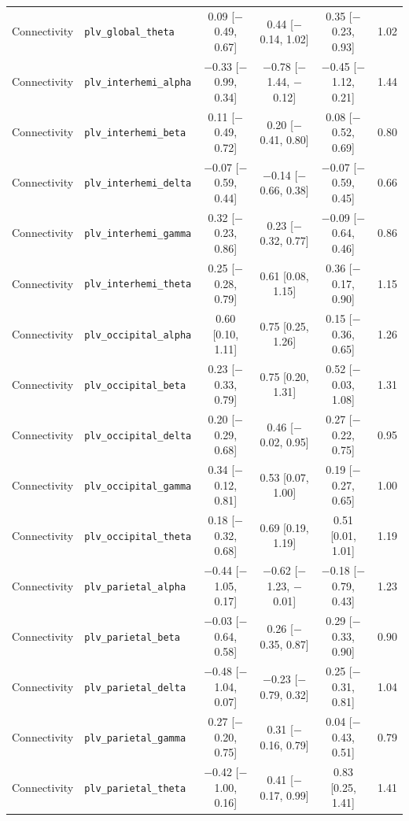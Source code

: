 {\begin{longtable}{llcccc}
Connectivity & \texttt{plv\_global\_theta} & 0.09 [$-$0.49, 0.67] & 0.44 [$-$0.14, 1.02] & 0.35 [$-$0.23, 0.93] & 1.02 \\
Connectivity & \texttt{plv\_interhemi\_alpha} & $-$0.33 [$-$0.99, 0.34] & $-$0.78 [$-$1.44, $-$0.12] & $-$0.45 [$-$1.12, 0.21] & 1.44 \\
Connectivity & \texttt{plv\_interhemi\_beta} & 0.11 [$-$0.49, 0.72] & 0.20 [$-$0.41, 0.80] & 0.08 [$-$0.52, 0.69] & 0.80 \\
Connectivity & \texttt{plv\_interhemi\_delta} & $-$0.07 [$-$0.59, 0.44] & $-$0.14 [$-$0.66, 0.38] & $-$0.07 [$-$0.59, 0.45] & 0.66 \\
Connectivity & \texttt{plv\_interhemi\_gamma} & 0.32 [$-$0.23, 0.86] & 0.23 [$-$0.32, 0.77] & $-$0.09 [$-$0.64, 0.46] & 0.86 \\
Connectivity & \texttt{plv\_interhemi\_theta} & 0.25 [$-$0.28, 0.79] & 0.61 [0.08, 1.15] & 0.36 [$-$0.17, 0.90] & 1.15 \\
Connectivity & \texttt{plv\_occipital\_alpha} & 0.60 [0.10, 1.11] & 0.75 [0.25, 1.26] & 0.15 [$-$0.36, 0.65] & 1.26 \\
Connectivity & \texttt{plv\_occipital\_beta} & 0.23 [$-$0.33, 0.79] & 0.75 [0.20, 1.31] & 0.52 [$-$0.03, 1.08] & 1.31 \\
Connectivity & \texttt{plv\_occipital\_delta} & 0.20 [$-$0.29, 0.68] & 0.46 [$-$0.02, 0.95] & 0.27 [$-$0.22, 0.75] & 0.95 \\
Connectivity & \texttt{plv\_occipital\_gamma} & 0.34 [$-$0.12, 0.81] & 0.53 [0.07, 1.00] & 0.19 [$-$0.27, 0.65] & 1.00 \\
Connectivity & \texttt{plv\_occipital\_theta} & 0.18 [$-$0.32, 0.68] & 0.69 [0.19, 1.19] & 0.51 [0.01, 1.01] & 1.19 \\
Connectivity & \texttt{plv\_parietal\_alpha} & $-$0.44 [$-$1.05, 0.17] & $-$0.62 [$-$1.23, $-$0.01] & $-$0.18 [$-$0.79, 0.43] & 1.23 \\
Connectivity & \texttt{plv\_parietal\_beta} & $-$0.03 [$-$0.64, 0.58] & 0.26 [$-$0.35, 0.87] & 0.29 [$-$0.33, 0.90] & 0.90 \\
Connectivity & \texttt{plv\_parietal\_delta} & $-$0.48 [$-$1.04, 0.07] & $-$0.23 [$-$0.79, 0.32] & 0.25 [$-$0.31, 0.81] & 1.04 \\
Connectivity & \texttt{plv\_parietal\_gamma} & 0.27 [$-$0.20, 0.75] & 0.31 [$-$0.16, 0.79] & 0.04 [$-$0.43, 0.51] & 0.79 \\
Connectivity & \texttt{plv\_parietal\_theta} & $-$0.42 [$-$1.00, 0.16] & 0.41 [$-$0.17, 0.99] & 0.83 [0.25, 1.41] & 1.41 \\

\end{longtable}}
